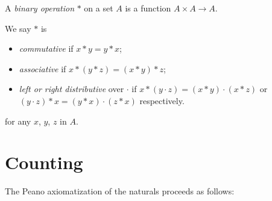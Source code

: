 \documentclass{../../template/note}
\begin{document}
    \begin{definition}
        A \emph{binary operation} \(*\) on a set \(A\) is a function \(A \times A \to A\).

        We say \(*\) is
        \begin{itemize}
            \item \emph{commutative} if \(x * y = y * x\);
            \item \emph{associative} if \(x * (y * z) = (x * y) * z\);
            \item \emph{left or right distributive} over \(\cdot\) if \(x * (y \cdot z) = (x * y) \cdot (x * z)\) or \((y \cdot z) * x = (y * x) \cdot (z * x)\) respectively.
        \end{itemize}
        for any \(x\), \(y\), \(z\) in \(A\).
        
    \end{definition}
    
    \section{Counting}

    The Peano axiomatization of the naturals proceeds as follows:
\end{document}
